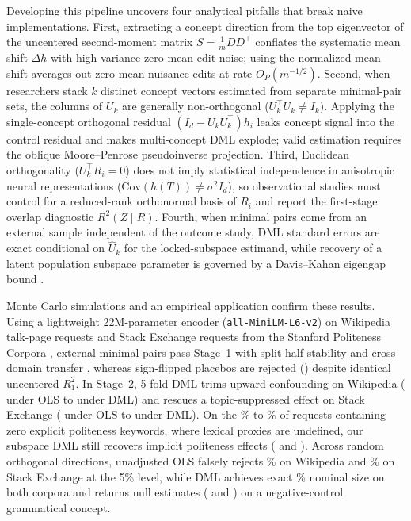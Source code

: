 \documentclass[11pt]{article}
\begin{document}
Developing this pipeline uncovers four analytical pitfalls that break naive implementations. First, extracting a concept direction from the top eigenvector of the uncentered second-moment matrix $S = \frac{1}{m}DD^\top$ conflates the systematic mean shift $\bar{\Delta h}$ with high-variance zero-mean edit noise; using the normalized mean shift averages out zero-mean nuisance edits at rate $O_P(m^{-1/2})$. Second, when researchers stack $k$ distinct concept vectors estimated from separate minimal-pair sets, the columns of $U_k$ are generally non-orthogonal ($U_k^\top U_k \neq I_k$). Applying the single-concept orthogonal residual $(I_d - U_k U_k^\top)h_i$ leaks concept signal into the control residual and makes multi-concept DML explode; valid estimation requires the oblique Moore--Penrose pseudoinverse projection. Third, Euclidean orthogonality ($U_k^\top R_i = 0$) does not imply statistical independence in anisotropic neural representations ($\mathrm{Cov}(h(T)) \neq \sigma^2 I_d$), so observational studies must control for a reduced-rank orthonormal basis of $R_i$ and report the first-stage overlap diagnostic $R^2(Z \mid R)$. Fourth, when minimal pairs come from an external sample independent of the outcome study, DML standard errors are exact conditional on $\hat{U}_k$ for the locked-subspace estimand, while recovery of a latent population subspace parameter is governed by a Davis--Kahan eigengap bound \citep{davis1970rotation}.

Monte Carlo simulations and an empirical application confirm these results. Using a lightweight 22M-parameter encoder (\texttt{all-MiniLM-L6-v2}) on \empNWiki{} Wikipedia talk-page requests and \empNSe{} Stack Exchange requests from the Stanford Politeness Corpora \citep{danescu2013computational}, external minimal pairs pass Stage~1 with split-half stability \empPolSplit{} and cross-domain transfer \empPolOod, whereas sign-flipped placebos are rejected (\empRndSplit) despite identical uncentered $R_1^2$. In Stage~2, 5-fold DML trims upward confounding on Wikipedia (\empWikiOls{} under OLS to \empWikiDml{} under DML) and rescues a topic-suppressed effect on Stack Exchange (\empSeOls{} under OLS to \empSeDml{} under DML). On the \empWikiNoKwPct\% to \empSeNoKwPct\% of requests containing zero explicit politeness keywords, where lexical proxies are undefined, our subspace DML still recovers implicit politeness effects (\empWikiImp{} and \empSeImp). Across random orthogonal directions, unadjusted OLS falsely rejects \empWikiRandOls\% on Wikipedia and \empSeRandOls\% on Stack Exchange at the 5\% level, while DML achieves exact \empWikiRandDml\% nominal size on both corpora and returns null estimates (\empWikiPluDml{} and \empSePluDml) on a negative-control grammatical concept.
\end{document}
